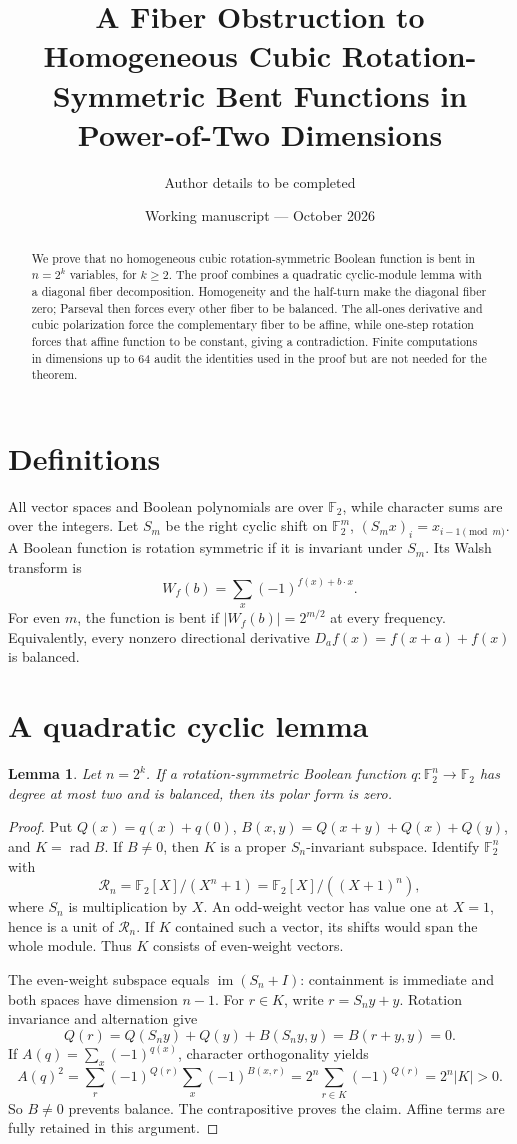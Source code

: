 \documentclass[11pt]{article}
\title{A Fiber Obstruction to Homogeneous Cubic Rotation-Symmetric Bent Functions in Power-of-Two Dimensions}
\author{Author details to be completed}
\date{Working manuscript --- October 2026}
\newtheorem{lemma}[theorem]{Lemma}
\newcommand{\F}{\mathbb F_2}
\newcommand{\rad}{\operatorname{rad}}
\begin{document}
\maketitle
\begin{abstract}
We prove that no homogeneous cubic rotation-symmetric Boolean function is bent in \(n=2^k\) variables, for \(k\ge2\). The proof combines a quadratic cyclic-module lemma with a diagonal fiber decomposition. Homogeneity and the half-turn make the diagonal fiber zero; Parseval then forces every other fiber to be balanced. The all-ones derivative and cubic polarization force the complementary fiber to be affine, while one-step rotation forces that affine function to be constant, giving a contradiction. Finite computations in dimensions up to 64 audit the identities used in the proof but are not needed for the theorem.
\end{abstract}

\section{Definitions}
All vector spaces and Boolean polynomials are over \(\F\), while character sums are over the integers. Let \(S_m\) be the right cyclic shift on \(\F^m\), \((S_mx)_i=x_{i-1\pmod m}\). A Boolean function is rotation symmetric if it is invariant under \(S_m\). Its Walsh transform is
\[
W_f(b)=\sum_x(-1)^{f(x)+b\cdot x}.
\]
For even \(m\), the function is bent if \(|W_f(b)|=2^{m/2}\) at every frequency. Equivalently, every nonzero directional derivative \(D_af(x)=f(x+a)+f(x)\) is balanced.

\section{A quadratic cyclic lemma}
\begin{lemma}\label{lem:q}
Let \(n=2^k\). If a rotation-symmetric Boolean function \(q:\F^n\to\F\) has degree at most two and is balanced, then its polar form is zero.
\end{lemma}
\begin{proof}
Put \(Q(x)=q(x)+q(0)\), \(B(x,y)=Q(x+y)+Q(x)+Q(y)\), and \(K=\rad B\). If \(B\ne0\), then \(K\) is a proper \(S_n\)-invariant subspace. Identify \(\F^n\) with
\[
\mathcal R_n=\F[X]/(X^n+1)=\F[X]/((X+1)^n),
\]
where \(S_n\) is multiplication by \(X\). An odd-weight vector has value one at \(X=1\), hence is a unit of \(\mathcal R_n\). If \(K\) contained such a vector, its shifts would span the whole module. Thus \(K\) consists of even-weight vectors.

The even-weight subspace equals \(\operatorname{im}(S_n+I)\): containment is immediate and both spaces have dimension \(n-1\). For \(r\in K\), write \(r=S_ny+y\). Rotation invariance and alternation give
\[
Q(r)=Q(S_ny)+Q(y)+B(S_ny,y)=B(r+y,y)=0.
\]
If \(A(q)=\sum_x(-1)^{q(x)}\), character orthogonality yields
\[
A(q)^2=\sum_r(-1)^{Q(r)}\sum_x(-1)^{B(x,r)}
=2^n\sum_{r\in K}(-1)^{Q(r)}=2^n|K|>0.
\]
So \(B\ne0\) prevents balance. The contrapositive proves the claim. Affine terms are fully retained in this argument.
\end{proof}
\end{document}
